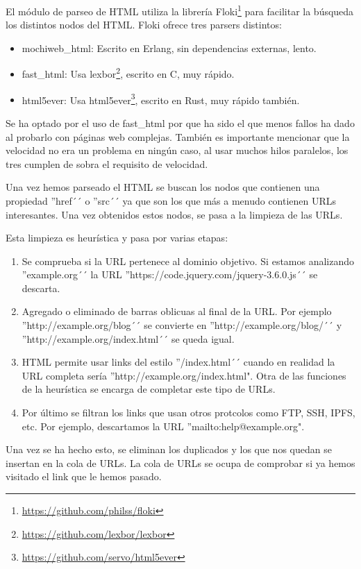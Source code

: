 El módulo de parseo de HTML utiliza la librería Floki\footnote{\url{https://github.com/philss/floki}} para facilitar la búsqueda los distintos nodos del HTML. Floki ofrece tres parsers distintos:

\begin{itemize}
  \item mochiweb\_html: Escrito en Erlang, sin dependencias externas, lento.
  \item fast\_html: Usa lexbor\footnote{\url{https://github.com/lexbor/lexbor}}, escrito en C, muy rápido.
  \item html5ever: Usa html5ever\footnote{\url{https://github.com/servo/html5ever}}, escrito en Rust, muy rápido también.
\end{itemize}

Se ha optado por el uso de fast\_html por que ha sido el que menos fallos ha dado al probarlo con páginas web complejas. También es importante mencionar que la velocidad no era un problema en ningún caso, al usar muchos hilos paralelos, los tres cumplen de sobra el requisito de velocidad.

Una vez hemos parseado el HTML se buscan los nodos que contienen una propiedad ''href´´ o ''src´´ ya que son los que más a menudo contienen URLs interesantes. Una vez obtenidos estos nodos, se pasa a la limpieza de las URLs.

Esta limpieza es heurística y pasa por varias etapas:

\begin{enumerate}
  \item Se comprueba si la URL pertenece al dominio objetivo. Si estamos analizando ''example.org´´ la URL ''https://code.jquery.com/jquery-3.6.0.js´´ se descarta.
  \item Agregado o eliminado de barras oblicuas al final de la URL. Por ejemplo ''http://example.org/blog´´ se convierte en ''http://example.org/blog/´´ y ''http://example.org/index.html´´ se queda igual. 
  \item HTML permite usar links del estilo ''/index.html´´ cuando en realidad la URL completa sería ''http://example.org/index.html". Otra de las funciones de la heurística se encarga de completar este tipo de URLs.
  \item Por último se filtran los links que usan otros protcolos como FTP, SSH, IPFS, etc. Por ejemplo, descartamos la URL ''mailto:help@example.org".
\end{enumerate}

Una vez se ha hecho esto, se eliminan los duplicados y los que nos quedan se insertan en la cola de URLs. La cola de URLs se ocupa de comprobar si ya hemos visitado el link que le hemos pasado.
